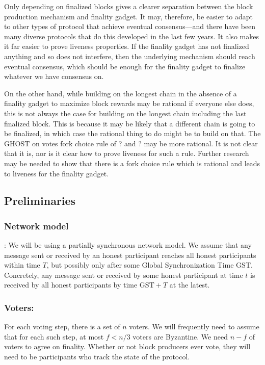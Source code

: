 \documentclass[a4paper,UKenglish,cleveref, autoref, thm-restate, anonymous]{lipics-v2019}
\def\GST{\mathrm{GST}}
\begin{document}
{Only depending on finalized blocks gives a clearer separation between the block production mechanism and finality gadget. It may, therefore, be easier to adapt to other types of protocol that achieve eventual consensus—and there have been many diverse protocols that do this developed in the last few years.
It also makes it far easier to prove liveness properties.
If the finality gadget has not finalized anything and so does not interfere, then the underlying mechanism should reach eventual consensus, which should be enough for the finality gadget to finalize whatever we have consensus on.

On the other hand, while building on the longest chain in the absence of a finality gadget to maximize block rewards may be rational if everyone else does, this is not always the case for building on the longest chain including the last finalized block.
This is because it may be likely that a different chain is going to be finalized, in which case the rational thing to do might be to build on that. The GHOST on votes fork choice rule of ? and ? may be more rational.
It is not clear that it is, nor is it clear how to prove liveness for such a rule. Further research may be needed to show that there is a fork choice rule which is rational and leads to liveness for the finality gadget. 



}
\subsection{Preliminaries} \label{sec:prelims}

\subsubsection{Network model}: We will be using a partially synchronous network model.
We assume that any message sent or received by an honest participant reaches all honest participants within time $T$, but possibly only after some Global Synchronization Time $\GST$.
Concretely, any message sent or received by some honest participant at time $t$ is received by all honest participants by time $\GST+T$ at the latest.


\subsubsection{Voters:} 
For each voting step, there is a set of $n$ voters.
We will frequently need to assume that for each such step, at most  $f < n/3$ voters are Byzantine.
We need $n-f$ of voters to agree on finality. Whether or not block producers ever vote, they will need to be participants who track the state of the protocol.
\end{document}

